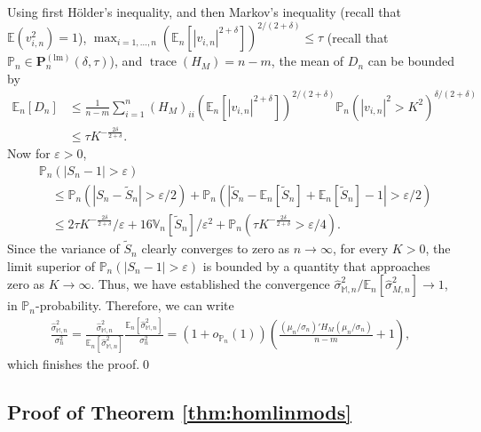 \documentclass[preprint]{imsart}
\newcommand{\E}{{\mathbb E}}
\newcommand{\V}{{\mathbb V}}
\renewcommand{\P}{{\mathbb P}}
\newcommand{\eps}{\varepsilon}
\newcommand{\M}{\mathbb M}
\DeclareMathOperator{\trace}{trace}
\numberwithin{equation}{section}
\begin{document}
%
Using first H\"older's inequality, and then Markov's inequality (recall that $\mathbb{E}(v^2_{i,n}) = 1$), $\max_{i = 1, \hdots, n} \left(\E_n[|v_{i,n}|^{2+\delta}]\right)^{2/(2+\delta)} \leq \tau$ (recall that $\P_n\in\mathbf{P}_n^{(\mathrm{lm})}(\delta,\tau)$), and $\trace(H_M) = n-m$, the mean of $D_n$ can be bounded by
%
\begin{align*}
\E_n[D_n] &\le \frac{1}{n-m}\sum_{i=1}^n(H_M)_{ii} \left(\E_n[|v_{i,n}|^{2+\delta}]\right)^{2/(2+\delta)}\P_n(|v_{i,n}|^2>K^2)^{\delta/(2+\delta)}\\
&\le 
\tau K^{-\frac{2\delta}{2+\delta}}.
\end{align*}
%
Now for $\eps>0$,
\begin{align*}
&\P_n(|S_n-1|>\eps) \\
&\quad\le
\P_n(|S_n-\tilde{S}_n|>\eps/2)  +  \P_n(|\tilde{S}_n- \E_n[\tilde{S}_n] + \E_n[\tilde{S}_n]-1|>\eps/2)\\
&\quad\le
2\tau K^{-\frac{2\delta}{2+\delta}}/\eps + 16\V_n[\tilde{S}_n]/\eps^2 + \P_n(\tau K^{-\frac{2\delta}{2+\delta}}>\eps/4).
\end{align*}
Since the variance of $\tilde{S}_n$ clearly converges to zero as $n\to\infty$, for every $K>0$, the limit superior of $\P_n(|S_n-1|>\eps)$ is bounded by a quantity that approaches zero as $K\to\infty$. Thus, we have established the convergence $\hat{\sigma}_{\M,n}^2/\E_n[\hat{\sigma}_{M,n}^2] \to 1$, in $\P_n$-probability.
Therefore, we can write
\begin{align*}
\frac{\hat{\sigma}_{\M,n}^2}{\sigma_n^2} 
=
\frac{\hat{\sigma}_{\M,n}^2}{\E_n[\hat{\sigma}_{\M,n}^2]} \frac{\E_n[\hat{\sigma}_{\M,n}^2]}{\sigma_n^2}
=
(1+o_{\P_n}(1))  
\left(
\frac{(\mu_n/\sigma_n)'H_M(\mu_n/\sigma_n)}{n-m} + 1
\right),
\end{align*}
which finishes the proof.\hfill\qed



\subsection{Proof of Theorem \ref{thm:homlinmods}}
\end{document}
